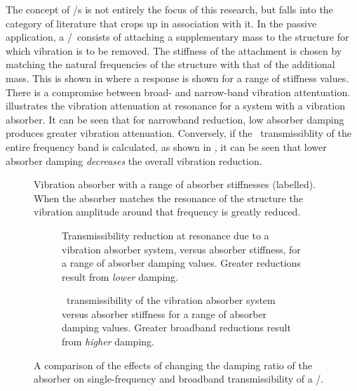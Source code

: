 The concept of \vibneut/{}s is not entirely the focus of this research, but
falls into the category of literature that crops up in association with it.
In
the passive application, a \vibneut/\ consists of attaching a supplementary
mass to the structure for which vibration is to be removed.
The stiffness of
the attachment is chosen by matching the natural frequencies of the structure
with that of the additional mass.
This is shown in 
where a response is shown for a range of stiffness values.
There is a
compromise between broad- and narrow-band vibration attentuation.
 illustrates the vibration attenuation at
resonance for a system with a vibration absorber.
It can be seen that for
narrowband reduction, low absorber damping produces greater vibration
attenuation.
Conversely, if the \RMS\ transmissiblity of the entire frequency
band is calculated, as shown in , it can be seen that
lower absorber damping \emph{decreases} the overall vibration reduction.

\begin{figure}
   \caption{Vibration absorber with a range of absorber stiffnesses (labelled).
   When the absorber matches the resonance of the structure the vibration 
   amplitude around that frequency is greatly reduced.}
\end{figure}

\begin{figure}
\begin{wide}
  \begin{subfigure}
    \caption{Transmissibility reduction at resonance due to a vibration 
    absorber system, versus absorber stiffness, for a range of absorber 
    damping values.
    Greater reductions result from \emph{lower} damping.}
  \end{subfigure}
  \begin{subfigure}
    \caption{\RMS\ transmissibility of the vibration absorber system versus 
    absorber stiffness for a range of absorber damping values.
    Greater 
    broadband reductions result from \emph{higher} damping.}
  \end{subfigure}
\end{wide}
\caption{A comparison of the effects of changing the damping ratio of the 
absorber on single-frequency and broadband transmissibility of a \vibneut/.}
\end{figure}

